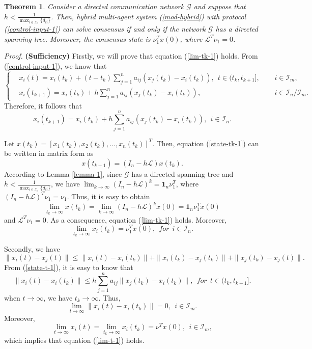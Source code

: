 \documentclass[12pt,draftcls,onecolumn]{IEEEtran}
\newtheorem{theorem}{Theorem}
\begin{document}
\begin{theorem}\label{consensus-case1}
Consider a directed communication network $\mathscr{G}$ and suppose that $h<\frac{1}{\max_{i\in \mathcal{I}_n}\{d_{ii}\}}$. Then, hybrid multi-agent system (\ref{mod-hybrid}) with protocol (\ref{control-input-1}) can solve consensus if and only if the network $\mathscr{G}$ has a directed spanning tree. Moreover, the consensus state is $\nu^{T}_{1}x(0)$, where $\mathscr{L}^T\nu_{1}=0$.  \end{theorem}

{\it Proof.} \textbf{(Sufficiency)} Firstly, we will prove that equation (\ref{lim-tk-1}) holds. From (\ref{control-input-1}), we know that
\begin{equation}\label{state-t-1}
\left\{
\begin{aligned}
&x_i(t)=x_i(t_k)+(t-t_k)\sum_{j=1}^na_{ij}(x_j(t_k)-x_i(t_k)),~~t\in (t_k,t_{k+1}], ~~&&i\in \mathcal{I}_m,\\
&x_i(t_{k+1})=x_i(t_k)+h\sum_{j=1}^na_{ij}(x_j(t_k)-x_i(t_k)), && i\in\mathcal{I}_{n}/\mathcal{I}_{m}.
\end{aligned}
\right.
\end{equation}
Therefore, it follows that
\begin{equation}\label{state-tk-1}
x_i(t_{k+1})=x_i(t_k)+h\sum_{j=1}^na_{ij}(x_j(t_k)-x_i(t_k)), ~~ i\in \mathcal{I}_n.
\end{equation}

Let $x(t_k)=[x_1(t_k),x_2(t_k),...,x_n(t_k)]^T$. Then, equation (\ref{state-tk-1}) can be written in matrix form as
\begin{equation}\label{state-mtr-1}
x(t_{k+1})=(I_n-h\mathscr{L})x(t_k).
\end{equation}
According to Lemma \ref{lemma-1}, since $\mathscr{G}$ has a directed spanning tree and $h<\frac{1}{\max_{i\in \mathcal{I}_n}\{d_{ii}\}}$, we have
$\lim_{k\rightarrow \infty} (I_n-h\mathscr{L})^k=\mathbf{1}_n\nu^{T}_{1}$,
where $(I_n-h\mathscr{L})^T\nu_{1}=\nu_{1}$. Thus, it is easy to obtain
\[
\lim_{t_k\rightarrow \infty}x(t_{k})=\lim_{k\rightarrow \infty}(I_n-h\mathscr{L})^kx(0)=\mathbf{1}_n\nu^{T}_{1} x(0)
\]
and $\mathscr{L}^T\nu_{1}=0$.
As a consequence, equation (\ref{lim-tk-1}) holds. Moreover,
\[
\lim_{t_k\rightarrow \infty}x_i(t_{k})=\nu^{T}_{1} x(0),~~for~~i\in \mathcal{I}_{n}.
\]

Secondly, we have
\[
\|x_i(t)-x_j(t)\|\leq \|x_i(t)-x_i(t_k)\|+\|x_i(t_{k})-x_j(t_k)\|+\|x_j(t_{k})-x_j(t)\|.
\]
From (\ref{state-t-1}),  it is easy to know that
\[
\|x_i(t)-x_i(t_k)\|\leq h\sum_{j=1}^na_{ij}\|x_j(t_k)-x_i(t_k)\|, ~~for~~t\in (t_k,t_{k+1}].
\]
when $t \rightarrow \infty$, we have $t_k \rightarrow \infty$. Thus,
$$
\lim_{t\rightarrow \infty}\|x_i(t)-x_i(t_k)\|=0,~~i\in\mathcal{I}_{m}.
$$
Moreover,
$$\lim_{t\rightarrow \infty}x_i(t)=\lim_{t_k\rightarrow \infty}x_i(t_{k})=\nu^T x(0),~~i\in\mathcal{I}_{m},$$
which implies that equation (\ref{lim-t-1}) holds.
\end{document}
